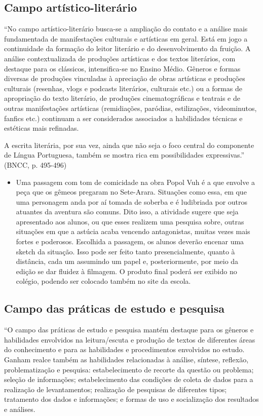 \documentclass[12pt]{extarticle}
\begin{document}
\subsection{Campo artístico-literário }

``No campo artístico-literário busca-se a ampliação do contato e a
análise mais fundamentada de manifestações culturais e artísticas em
geral. Está em jogo a continuidade da formação do leitor literário e do
desenvolvimento da fruição. A análise contextualizada de produções
artísticas e dos textos literários, com destaque para os clássicos,
intensifica-se no Ensino Médio. Gêneros e formas diversas de produções
vinculadas à apreciação de obras artísticas e produções culturais
(resenhas, vlogs e podcasts literários, culturais etc.) ou a formas de
apropriação do texto literário, de produções cinematográficas e teatrais
e de outras manifestações artísticas (remidiações, paródias,
estilizações, videominutos, fanfics etc.) continuam a ser considerados
associados a habilidades técnicas e estéticas mais refinadas.

A escrita literária, por sua vez, ainda que não seja o foco central do
componente de Língua Portuguesa, também se mostra rica em possibilidades
expressivas.'' (BNCC, p. 495-496)

\begin{itemize}
\item
  Uma passagem com tom de comicidade na obra Popol Vuh é a que envolve a
  peça que os gêmeos pregaram no Sete-Arara. Situações como essa, em que
  uma personagem anda por aí tomada de soberba e é ludibriada por outros
  atuantes da aventura são comuns. Dito isso, a atividade sugere que
  seja apresentado aos alunos, ou que esses realizem uma pesquisa sobre,
  outras situações em que a astúcia acaba vencendo antagonistas, muitas
  vezes mais fortes e poderosos. Escolhida a passagem, os alunos deverão
  encenar uma sketch da situação. Isso pode ser feito tanto
  presencialmente, quanto à distância, cada um assumindo um papel e,
  posteriormente, por meio da edição se dar fluidez à filmagem. O
  produto final poderá ser exibido no colégio, podendo ser colocado
  também no site da escola.
\end{itemize}

\subsection{Campo das práticas de estudo e pesquisa }

``O campo das práticas de estudo e pesquisa mantém destaque para os
gêneros e habilidades envolvidos na leitura/escuta e produção de textos
de diferentes áreas do conhecimento e para as habilidades e
procedimentos envolvidos no estudo. Ganham realce também as habilidades
relacionadas à análise, síntese, reflexão, problematização e pesquisa:
estabelecimento de recorte da questão ou problema; seleção de
informações; estabelecimento das condições de coleta de dados para a
realização de levantamentos; realização de pesquisas de diferentes
tipos; tratamento dos dados e informações; e formas de uso e
socialização dos resultados e análises.
\end{document}
